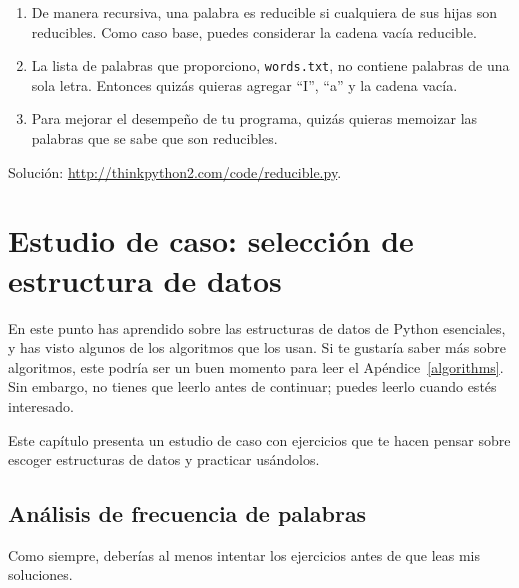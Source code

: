 \documentclass[10pt]{book}
\begin{document}
\begin{exercise}
\begin{enumerate}
\item De manera recursiva, una palabra es reducible si cualquiera de sus hijas
son reducibles.  Como caso base, puedes considerar la cadena vacía
reducible.

\item La lista de palabras que proporciono, {\tt words.txt}, no
contiene palabras de una sola letra.  Entonces quizás quieras agregar
``I'', ``a'' y la cadena vacía.

\item Para mejorar el desempeño de tu programa, quizás quieras
memoizar las palabras que se sabe que son reducibles.

\end{enumerate}

Solución: \url{http://thinkpython2.com/code/reducible.py}.

\end{exercise}








\chapter{Estudio de caso: selección de estructura de datos}

En este punto has aprendido sobre las estructuras de datos de Python esenciales,
y has visto algunos de los algoritmos que los usan.
Si te gustaría saber más sobre algoritmos, este podría ser un buen
momento para leer el Apéndice~\ref{algorithms}.
Sin embargo, no tienes que leerlo antes de continuar; puedes leerlo
cuando estés interesado.

Este capítulo presenta un estudio de caso con ejercicios que te hacen
pensar sobre escoger estructuras de datos y practicar usándolos.


\section{Análisis de frecuencia de palabras}
\label{analysis}

Como siempre, deberías al menos intentar los ejercicios
antes de que leas mis soluciones.
\end{document}
